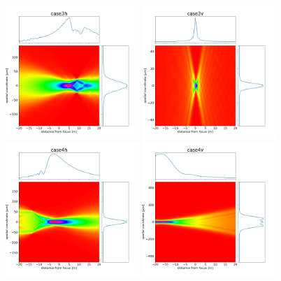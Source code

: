 \documentclass[]{article}
\begin{document}
\begin{figure}
\includegraphics[width=0.45\textwidth]{figures/case3h_caustic.png}
\includegraphics[width=0.45\textwidth]{figures/case3v_caustic.png}
\includegraphics[width=0.45\textwidth]{figures/case4h_caustic.png}
\includegraphics[width=0.45\textwidth]{figures/case4v_caustic.png}
\end{figure}
\end{document}
